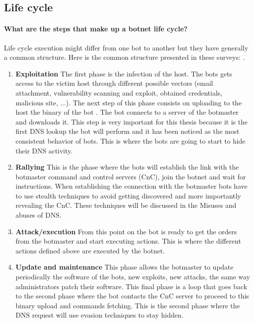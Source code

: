 \subsection{Life cycle}
\paragraph{What are the steps that make up a botnet life cycle?} Life cycle execution might differ from one bot to another but they have generally a common structure. Here is the common structure presented in these surveys: \cite{survey2} \cite{survey7} \cite{survey8} \cite{survey9}.
\begin{enumerate}
\item \textbf{Exploitation} The first phase is the infection of the host. The bots gets access to the victim host through different possible vectors (email attachment, vulnerability scanning and exploit, obtained credentials, malicious site, ...). The next step of this phase consists on uploading to the host the binary of the bot \cite{bot-appr}.
The bot connects to a server of the botmaster and downloads it. This step is very important for this thesis because it is the first DNS lookup the bot will perform and it has been noticed as the most consistent behavior of bots. This is where the bots are going to start to hide their DNS activity.
\cite{detection2}
\cite{detection3}
\cite{inside-bot}
\cite{detection4}
\item \textbf{Rallying} This is the phase where the bots will establish the link with the botmaster command and control servers (CnC), join the botnet and wait for instructions. When establishing the connection with the botmaster bots have to use stealth techniques to avoid getting discovered and more importantly revealing the CnC. These techniques will be discussed in the Misuses and abuses of DNS.
\cite{detection5}
\cite{detection6} 
\item \textbf{Attack/execution} From this point on the bot is ready to get the orders from the botmaster and start executing actions. This is where the different actions defined above are executed by the botnet.
\cite{survey10} 
\item \textbf{Update and maintenance}
This phase allows the botmaster to update periodically the software of the bots, new exploits, new attacks, the same way administrators patch their software. This final phase is a loop that goes back to the second phase where the bot contacts the CnC server to proceed to this binary upload and commands fetching. This is the second phase where the DNS request will use evasion techniques to stay hidden.
\cite{detection7}
\end{enumerate}
